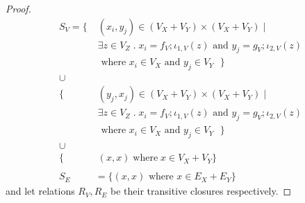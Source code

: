 \begin{proof}
    \else 
    \begin{align*}    
    S_{V} = \{&
          \;(x_i,y_j) \in (V_{X} + V_{Y}) \times (V_{X} + V_{Y})\; | \\
          &\;\exists z \in V_{Z} \; . \; x_i = f_{V};\iota_{1,V}(z) \text{ and } y_j = g_{V};\iota_{2,V}(z)\\
          &\;\text{ where $x_i \in V_{X}$ and $y_j \in V_{Y}$ }\}\\
          \cup&\\
          \{&
          \;(y_j,x_j) \in (V_{X} + V_{Y}) \times (V_{X} + V_{Y})\; | \\
          &\;\exists z \in V_{Z} \; . \; x_i = f_{V};\iota_{1,V}(z) \text{ and } y_j = g_{V};\iota_{2,V}(z)\\
          &\;\text{ where $x_i \in V_{X}$ and $y_j \in V_{Y}$ }\}\\
          \cup&\\
          \{
          &\;(x,x)\;\text{where}\; x \in V_{X} + V_{Y}\}\\
        \\
    S_{E} &= \{(x,x) \text{ where } x \in E_{X} + E_{Y}\}
    \end{align*}
    \fi
and let relations $R_{V},R_{E}$ be their transitive closures respectively.



\end{proof}
